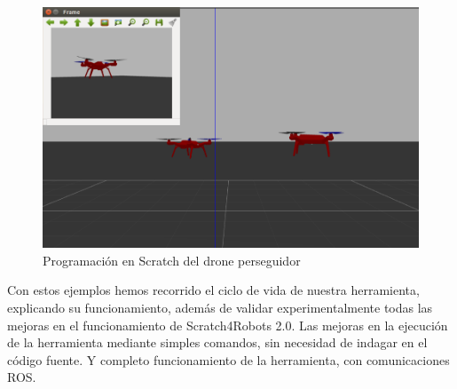 \begin{figure}[H]
    \centering
    \includegraphics[scale=0.60]{img/drones-fly.PNG}
  	\caption{Programación en Scratch del drone perseguidor}
  	\label{fig:turtlebot}
\end{figure}


Con estos ejemplos hemos recorrido el ciclo de vida de nuestra herramienta, explicando su funcionamiento, además de validar experimentalmente todas las mejoras en el funcionamiento de Scratch4Robots 2.0. Las mejoras en la ejecución de la herramienta mediante simples comandos, sin necesidad de indagar en el código fuente. Y completo funcionamiento de la herramienta, con comunicaciones ROS. 

